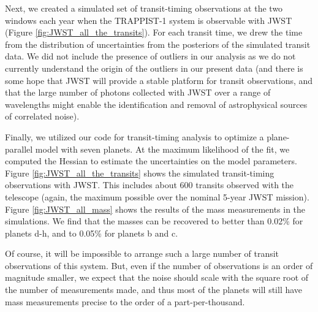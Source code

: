 \documentclass[twocolumn]{aastex63}
\begin{document}
Next, we created a simulated set of transit-timing observations at the two windows each year when the TRAPPIST-1 system is observable with JWST (Figure \ref{fig:JWST_all_the_transits}).   For each transit time, we drew the time from the distribution of uncertainties from the posteriors of the simulated transit data.  We did not include the presence of outliers in our analysis as we do not currently understand the origin of the outliers in our present data (and there is some hope that JWST will provide a stable platform for transit observations, and that the large number of photons collected with JWST over a range of wavelengths might enable the identification and removal of astrophysical sources of correlated noise).

Finally, we utilized our code for transit-timing analysis  to optimize a plane-parallel model with seven planets.  At the maximum likelihood of the fit, we computed the Hessian to estimate the uncertainties on the model parameters.  Figure \ref{fig:JWST_all_the_transits} shows the simulated transit-timing observations with JWST.   This includes about 600 transits observed with the telescope (again, the maximum possible over the nominal 5-year JWST mission).  Figure \ref{fig:JWST_all_mass} shows the results of the mass measurements in the simulations.  We find that the masses can be recovered to better than 0.02\% for planets d-h, and to 0.05\% for planets b and c.

Of course, it will be impossible to arrange such a large number of transit observations of this system.  But, even if the number of observations is an order of magnitude smaller, we expect that the noise should scale with the square root of the number of measurements made, and thus most of the planets will still have mass measurements precise to the order of a part-per-thousand.
\end{document}
